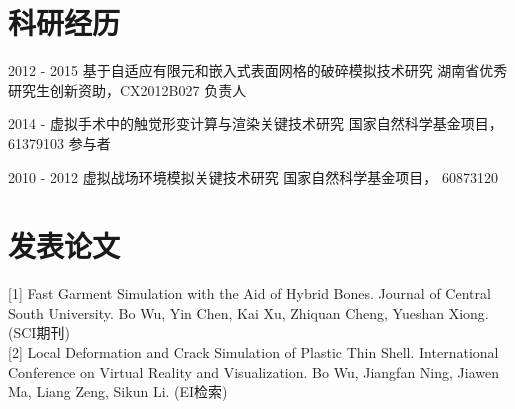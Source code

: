 \documentclass[20pt]{article} %
\begin{document}

\section{科研经历}
\job
{2012 - }{2015}
{基于自适应有限元和嵌入式表面网格的破碎模拟技术研究}
{湖南省优秀研究生创新资助，CX2012B027}
{负责人}

\job
{2014 - }{}
{虚拟手术中的触觉形变计算与渲染关键技术研究}
{国家自然科学基金项目，61379103}
{参与者}

\job
{2010 - }{2012}
{虚拟战场环境模拟关键技术研究}
{国家自然科学基金项目， 60873120}


\section{发表论文}
[1] {Fast Garment Simulation with the Aid of Hybrid Bones}. Journal of Central
South University. Bo Wu, Yin Chen, Kai Xu, Zhiquan Cheng, Yueshan Xiong.
(SCI期刊)\\

[2] {Local Deformation and Crack Simulation of Plastic Thin Shell}.
International Conference on Virtual Reality and Visualization. Bo Wu, Jiangfan
Ning, Jiawen Ma, Liang Zeng, Sikun Li. (EI检索)\\
\end{document}
